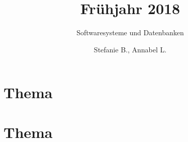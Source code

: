 \documentclass[stex]{ddifau}
\title{Fr\"uhjahr 2018}
\subtitle{Softwaresysteme und Datenbanken}
\author{Stefanie B., Annabel L.}
\begin{document}
\maketitle


\section{Thema}

\clearpage

\section{Thema}

\end{document}

